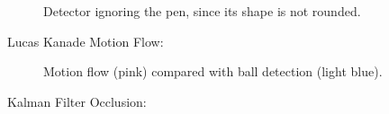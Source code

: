 \documentclass{sciposter}
\begin{document}
\begin{multicols}{3}
\begin{figure}[!h]
	\centering
			\setlength{\fboxsep}{1pt}
			\setlength{\fboxrule}{1pt}
	\caption{Detector ignoring the pen, since its shape is not rounded.}
	\label{fig:yes_hough}
\end{figure}

Lucas Kanade Motion Flow:

\begin{figure}[!h]
	\centering
			\setlength{\fboxsep}{1pt}
			\setlength{\fboxrule}{1pt}
	\caption{Motion flow (pink) compared with ball detection (light blue).}
	\label{fig:motion}
\end{figure}

Kalman Filter Occlusion:


\end{multicols}
\end{document}
